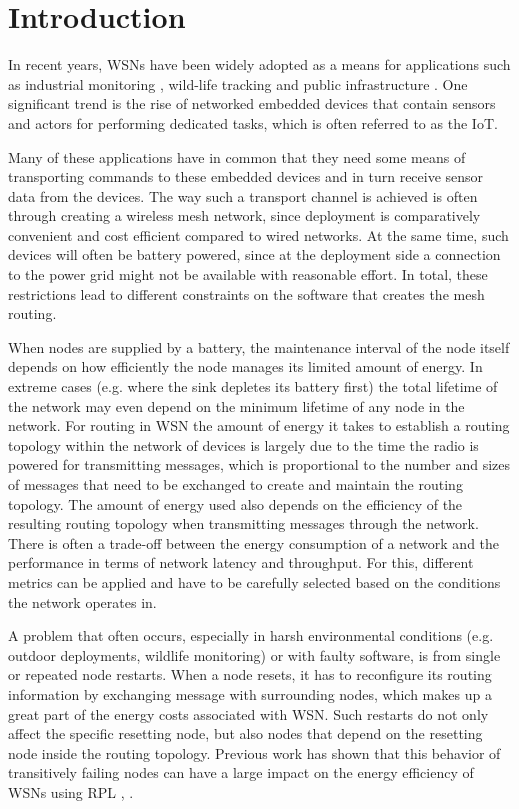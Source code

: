 \chapter{Introduction}

In recent years, \acp{WSN} have been widely adopted as a means for applications
such as industrial monitoring \cite{ding2010sensing} \cite{rfc5673}, wild-life
tracking \cite{cassens2017automated} and public infrastructure \cite{rfc5867}.
One significant trend is the rise of networked embedded devices that contain
sensors and actors for performing dedicated tasks, which is often referred to as
the \acf{IoT}.

Many of these applications have in common that they need some means of
transporting commands to these embedded devices and in turn receive sensor data
from the devices. The way such a transport channel is achieved is often through
creating a wireless mesh network, since deployment is comparatively convenient
and cost efficient compared to wired networks. At the same time, such devices
will often be battery powered, since at the deployment side a connection to the
power grid might not be available with reasonable effort. In total, these
restrictions lead to different constraints on the software that creates the mesh
routing.

When nodes are supplied by a battery, the maintenance interval of the node
itself depends on how efficiently the node manages its limited amount of energy.
In extreme cases (e.g. where the sink depletes its battery first) the total
lifetime of the network may even depend on the minimum lifetime of any node in
the network. For routing in \ac{WSN} the amount of energy it takes to establish
a routing topology within the network of devices is largely due to the time the
radio is powered for transmitting messages, which is proportional to the number
and sizes of messages that need to be exchanged to create and maintain the
routing topology. The amount of energy used also depends on the efficiency of
the resulting routing topology when transmitting messages through the network.
There is often a trade-off between the energy consumption of a network and the
performance in terms of network latency and throughput. For this, different
metrics can be applied and have to be carefully selected based on the conditions
the network operates in.

A problem that often occurs, especially in harsh environmental conditions (e.g.
outdoor deployments, wildlife monitoring) or with faulty software, is from
single or repeated node restarts. When a node resets, it has to reconfigure its
routing information by exchanging message with surrounding nodes, which makes up
a great part of the energy costs associated with \ac{WSN}. Such restarts do not
only affect the specific resetting node, but also nodes that depend on the
resetting node inside the routing topology. Previous work has shown that this
behavior of transitively failing nodes can have a large impact on the energy
efficiency of \acp{WSN} using \ac{RPL} \cite{kulau2017energy},
\cite{mueller2017}.


